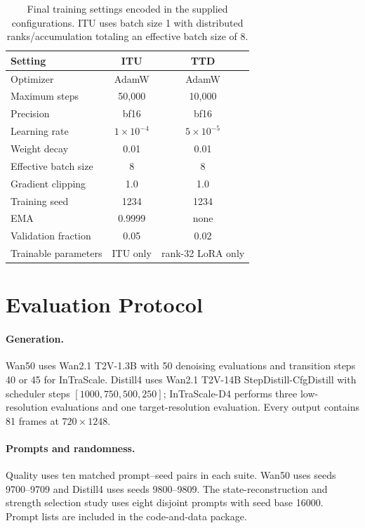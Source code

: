 \documentclass[letterpaper]{article}
\begin{document}
\begin{table}[H]
  \centering
  \small
  \setlength{\tabcolsep}{4pt}
  \begin{tabular}{lcc}
    \toprule
    Setting & ITU & TTD \\
    \midrule
    Optimizer & AdamW & AdamW \\
    Maximum steps & 50,000 & 10,000 \\
    Precision & bf16 & bf16 \\
    Learning rate & \(1{\times}10^{-4}\) & \(5{\times}10^{-5}\) \\
    Weight decay & 0.01 & 0.01 \\
    Effective batch size & 8 & 8 \\
    Gradient clipping & 1.0 & 1.0 \\
    Training seed & 1234 & 1234 \\
    EMA & 0.9999 & none \\
    Validation fraction & 0.05 & 0.02 \\
    Trainable parameters & ITU only & rank-32 LoRA only \\
    \bottomrule
  \end{tabular}
  \caption{Final training settings encoded in the supplied configurations.
  ITU uses batch size 1 with distributed ranks/accumulation totaling an
  effective batch size of 8.}
  \label{tab:training}
\end{table}

\section{Evaluation Protocol}

\paragraph{Generation.}
Wan50 uses Wan2.1 T2V-1.3B with 50 denoising evaluations and transition steps
40 or 45 for InTraScale.  Distill4 uses Wan2.1 T2V-14B
StepDistill-CfgDistill with scheduler steps
\([1000,750,500,250]\); InTraScale-D4 performs three low-resolution
evaluations and one target-resolution evaluation.  Every output contains 81
frames at \(720\times1248\).

\paragraph{Prompts and randomness.}
Quality uses ten matched prompt--seed pairs in each suite.  Wan50 uses seeds
9700--9709 and Distill4 uses seeds 9800--9809.  The state-reconstruction and
strength selection study uses eight disjoint prompts with seed base 16000.
Prompt lists are included in the code-and-data package.
\end{document}
